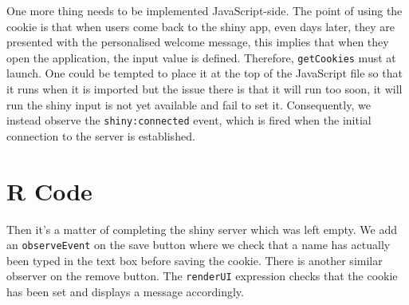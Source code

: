 \documentclass[10pt,]{krantz}
\makeatletter
\newenvironment{Shaded}{\begin{snugshade}}{\end{snugshade}}
\newcommand{\AttributeTok}[1]{\textcolor[rgb]{0.61,0.61,0.61}{#1}}
\newcommand{\CommentTok}[1]{\textcolor[rgb]{0.37,0.37,0.37}{\textit{#1}}}
\newcommand{\KeywordTok}[1]{\textcolor[rgb]{0.27,0.27,0.27}{\textbf{#1}}}
\newcommand{\NormalTok}[1]{#1}
\newcommand{\OperatorTok}[1]{\textcolor[rgb]{0.43,0.43,0.43}{\textbf{#1}}}
\newcommand{\StringTok}[1]{\textcolor[rgb]{0.5,0.5,0.5}{#1}}
\newenvironment{kframe}{%
\medskip{}
\setlength{\fboxsep}{.8em}
 \def\at@end@of@kframe{}%
 \ifinner\ifhmode%
  \def\at@end@of@kframe{\end{minipage}}%
  \begin{minipage}{\columnwidth}%
 \fi\fi%
 \def\FrameCommand##1{\hskip\@totalleftmargin \hskip-\fboxsep
 \colorbox{shadecolor}{##1}\hskip-\fboxsep
     \hskip-\linewidth \hskip-\@totalleftmargin \hskip\columnwidth}%
 \MakeFramed {\advance\hsize-\width
   \@totalleftmargin\z@ \linewidth\hsize
   \@setminipage}}%
 {\par\unskip\endMakeFramed%
 \at@end@of@kframe}
\renewenvironment{Shaded}{\begin{kframe}}{\end{kframe}}
\makeatother
\begin{document}
One more thing needs to be implemented JavaScript-side. The point of using the cookie is that when users come back to the shiny app, even days later, they are presented with the personalised welcome message, this implies that when they open the application, the input value is defined. Therefore, \texttt{getCookies} must at launch. One could be tempted to place it at the top of the JavaScript file so that it runs when it is imported but the issue there is that it will run too soon, it will run the shiny input is not yet available and fail to set it. Consequently, we instead observe the \texttt{shiny:connected} event, which is fired when the initial connection to the server is established.

\begin{Shaded}
\end{Shaded}

\hypertarget{shiny-cookies-r-code}{%
\section{R Code}\label{shiny-cookies-r-code}}

Then it's a matter of completing the shiny server which was left empty. We add an \texttt{observeEvent} on the save button where we check that a name has actually been typed in the text box before saving the cookie. There is another similar observer on the remove button. The \texttt{renderUI} expression checks that the cookie has been set and displays a message accordingly.
\end{document}
